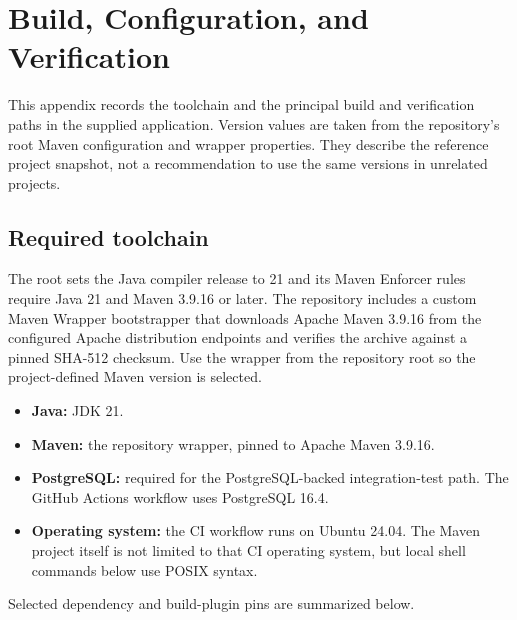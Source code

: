 \chapter{Build, Configuration, and Verification}
\label{app:build}

This appendix records the toolchain and the principal build and verification paths in the supplied application. Version values are taken from the repository's root Maven configuration and wrapper properties. They describe the reference project snapshot, not a recommendation to use the same versions in unrelated projects.

\section{Required toolchain}

The root  sets the Java compiler release to 21 and its Maven Enforcer rules require Java 21 and Maven 3.9.16 or later. The repository includes a custom Maven Wrapper bootstrapper that downloads Apache Maven 3.9.16 from the configured Apache distribution endpoints and verifies the archive against a pinned SHA-512 checksum. Use the wrapper from the repository root so the project-defined Maven version is selected.

\begin{itemize}
  \item \textbf{Java:} JDK 21.
  \item \textbf{Maven:} the repository wrapper, pinned to Apache Maven 3.9.16.
  \item \textbf{PostgreSQL:} required for the PostgreSQL-backed integration-test path. The GitHub Actions workflow uses PostgreSQL 16.4.
  \item \textbf{Operating system:} the CI workflow runs on Ubuntu 24.04. The Maven project itself is not limited to that CI operating system, but local shell commands below use POSIX syntax.
\end{itemize}

Selected dependency and build-plugin pins are summarized below.

